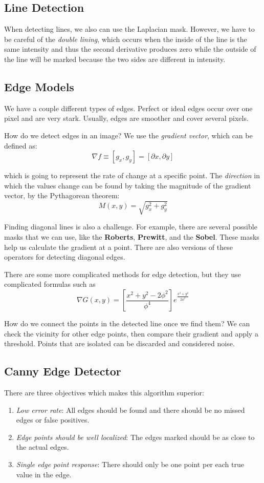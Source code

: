 \documentclass{tufte-handout}
\begin{document}
\subsection{Line Detection}
When detecting lines, we also can use the Laplacian mask. However, we have to be 
careful of the \emph{double lining}, which occurs when the inside of the line is the 
same intensity and thus the second derivative produces zero while the outside of the 
line will be marked because the two sides are different in intensity.


\subsection{Edge Models}
We have a couple different types of edges. Perfect or ideal edges occur over one 
pixel and are very stark. Usually, edges are smoother and cover several pixels.

How do we detect edges in an image? 
We use the \emph{gradient vector}, which can be defined as:
\[\nabla f \equiv [g_{x}, g_{y}] = [\partial x, \partial y]\]

which is going to represent the rate of change at a specific point. The \textit{direction}
in which the values change can be found by taking the magnitude of the gradient vector,
by the Pythagorean theorem:
\[M(x, y) = \sqrt{g_{x}^{2} + g_{y}^{2}}\]

Finding diagonal lines is also a challenge. For example, there are several possible 
masks that we can use, like the \textbf{Roberts}, \textbf{Prewitt}, and the 
\textbf{Sobel}. These masks help us calculate the gradient at a point. There are also 
versions of these operators for detecting diagonal edges.

There are some more complicated methods for edge detection, but they use complicated
formulas such as 
\[\nabla G(x, y) = [\frac{x^{2} + y^{2} - 2\phi^{2}}{\phi^{4}}]e^{\frac{x^{2} + y^{2}}{2\phi^{2}}}\]

How do we connect the points in the detected line once we find them? We can check 
the vicinity for other edge points, then compare their gradient and apply a threshold.
Points that are isolated can be discarded and considered noise.

\subsection{Canny Edge Detector}
There are three objectives which makes this algorithm superior:
\begin{enumerate}
		\item \emph{Low error rate}: All edges should be found and there should be
				no missed edges or false positives.
		\item \emph{Edge points should be well localized}: The edges marked should 
				be as close to the actual edges.
		\item \emph{Single edge point response}: There should only be one point 
				per each true value in the edge.
\end{enumerate}
\end{document}
